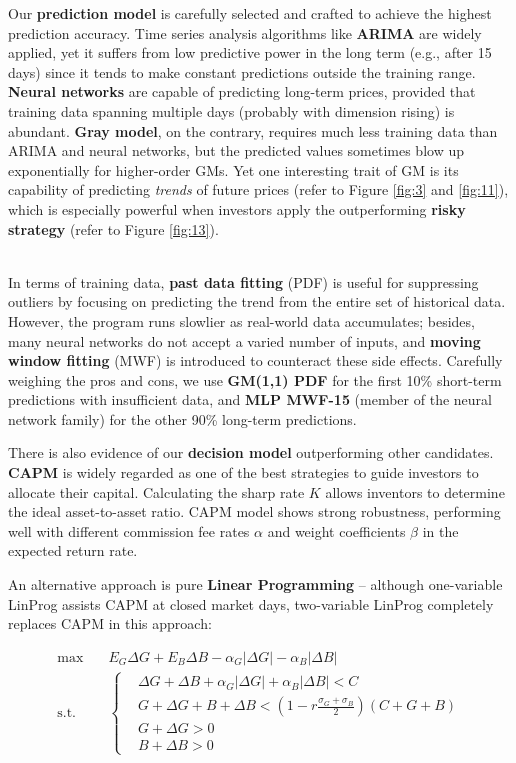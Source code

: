 \documentclass{mcmthesis}
\begin{document}
	Our \textbf{prediction model} is carefully selected and crafted to achieve the highest prediction accuracy. Time series analysis algorithms like \textbf{ARIMA} are widely applied, yet it suffers from low predictive power in the long term (e.g., after 15 days) since it tends to make constant predictions outside the training range. \textbf{Neural networks} are capable of predicting long-term prices, provided that training data spanning multiple days (probably with dimension rising) is abundant. \textbf{Gray model}, on the contrary, requires much less training data than ARIMA and neural networks, but the predicted values sometimes blow up exponentially for higher-order GMs. Yet one interesting trait of GM is its capability of predicting \textit{trends} of future prices (refer to Figure \ref{fig:3} and \ref{fig:11}), which is especially powerful when investors apply the outperforming \textbf{risky strategy} (refer to Figure \ref{fig:13}). 
	
	~\\
	
	In terms of training data, \textbf{past data fitting} (PDF) is useful for suppressing outliers by focusing on predicting the trend from the entire set of historical data. However, the program runs slowlier as real-world data accumulates; besides, many neural networks do not accept a varied number of inputs, and \textbf{moving window fitting} (MWF) is introduced to counteract these side effects. Carefully weighing the pros and cons, we use \textbf{GM(1,1) PDF} for the first 10\% short-term predictions with insufficient data, and \textbf{MLP MWF-15} (member of the neural network family) for the other 90\% long-term predictions. 
	
	There is also evidence of our \textbf{decision model} outperforming other candidates. \textbf{CAPM} is widely regarded as one of the best strategies to guide investors to allocate their capital. Calculating the sharp rate $K$ allows inventors to determine the ideal asset-to-asset ratio. CAPM model shows strong robustness, performing well with different commission fee rates $\alpha$ and weight coefficients $\beta$ in the expected return rate. 
	
	An alternative approach is pure \textbf{Linear Programming} -- although one-variable LinProg assists CAPM at closed market days, two-variable LinProg completely replaces CAPM in this approach: 
	
	$$
	\begin{aligned}
		\max \quad & E_G \Delta G + E_B \Delta B - \alpha_G |\Delta G| - \alpha_B |\Delta B| \\
		\textrm{s.t.} \quad & \left\{
		\begin{aligned}
			& \Delta G + \Delta B + \alpha_G |\Delta G| + \alpha_B |\Delta B| < C \\
			& G + \Delta G + B + \Delta B < \left(1-r\frac{\sigma_G+\sigma_B}{2}\right) \left(C+G+B\right) \\
			& G + \Delta G > 0 \\
			& B + \Delta B > 0
		\end{aligned}
		\right.
	\end{aligned}
	$$
	
\end{document}
